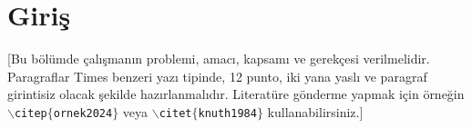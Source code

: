     \section{Giriş}
[Bu bölümde çalışmanın problemi, amacı, kapsamı ve gerekçesi verilmelidir. Paragraflar Times benzeri yazı tipinde, 12 punto, iki yana yaslı ve paragraf girintisiz olacak şekilde hazırlanmalıdır. Literatüre gönderme yapmak için örneğin \texttt{$\backslash$citep$\{$ornek2024$\}$} veya \texttt{$\backslash$citet$\{$knuth1984$\}$} kullanabilirsiniz.]